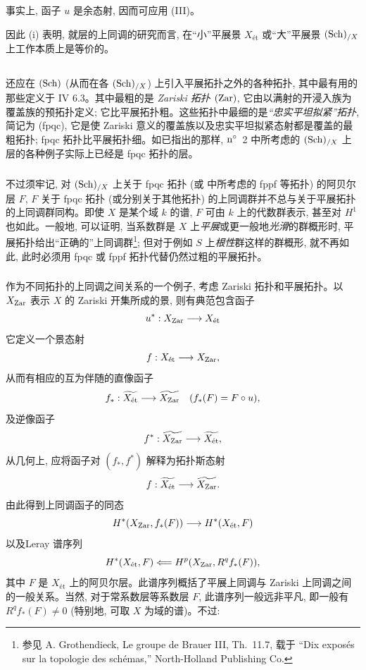 事实上, 函子 $u$ 是余态射, 因而可应用 (III)。

因此 (i) 表明, 就层的上同调的研究而言, 在“小”平展景 $X_{\text{ét}}$ 或“大”平展景 $(\operatorname{Sch})_{/X}$ 上工作本质上是等价的。

\setcounter{subsection}{1}
\subsection{}

还应在 $(\operatorname{Sch})$ (从而在各 $(\operatorname{Sch})_{/X}$) 上引入平展拓扑之外的各种拓扑, 其中最有用的那些定义于  IV 6.3。其中最粗的是 \emph{Zariski 拓扑} $(\operatorname{Zar})$, 它由以满射的开浸入族为覆盖族的预拓扑定义; 它比平展拓扑粗。这些拓扑中最细的是\emph{“忠实平坦拟紧”拓扑}, 简记为 (fpqc), 它是使 Zariski 意义的覆盖族以及忠实平坦拟紧态射都是覆盖的最粗拓扑; fpqc 拓扑比平展拓扑细。如已指出的那样, ${\rm n^{\circ}}$~2 中所考虑的 $(\operatorname{Sch})_{/X}$ 上层的各种例子实际上已经是 fpqc 拓扑的层。

\subsubsection{}

不过须牢记, 对 $(\operatorname{Sch})_{/X}$ 上关于 fpqc 拓扑 (或  中所考虑的 fppf 等拓扑) 的阿贝尔层 $F$, $F$ 关于 fpqc 拓扑 (或分别关于其他拓扑) 的上同调群并不总与关于\pageoriginale 平展拓扑的上同调群同构。即使 $X$ 是某个域 $k$ 的谱, $F$ 可由 $k$ 上的代数群表示, 甚至对 $H^1$ 也如此。一般地, 可以证明, 当系数群是 $X$ 上\emph{平展}或更一般地\emph{光滑}的群概形时, 平展拓扑给出“正确的”上同调群\footnote{参见 A. Grothendieck, Le groupe de Brauer III, Th.~11.7, 载于 “Dix exposés sur la topologie des schémas,” North-Holland Publishing Co.}; 但对于例如 $S$ 上\emph{根性}群这样的群概形, 就不再如此, 此时必须用 fpqc 或 fppf 拓扑代替仍然过粗的平展拓扑。

\subsubsection{}

作为不同拓扑的上同调之间关系的一个例子, 考虑 Zariski 拓扑和平展拓扑。以 $X_{\operatorname{Zar}}$ 表示 $X$ 的 Zariski 开集所成的景, 则有典范包含函子
$$
u^{\ast} : X_{\Zar} \to X_{\text{ét}}
$$
它定义一个景态射
$$
f : X_{\text{ét}} \to X_{\Zar}{\quoi},
$$
从而有相应的互为伴随的直像函子
$$
f_{\ast} : \widetilde{X_{\text{ét}}} \to \widetilde{X_{\Zar}}\quad
(f_{\ast} (F) = F \circ u){\quoi},
$$
及逆像函子
$$
f^{\ast} : \widetilde{X_{\Zar}} \to \widetilde{X_{\text{ét}}}{\quoi},
$$
从几何上, 应将函子对 $(f_{\ast},f^{\ast})$ 解释为拓扑斯态射
$$
f : \widetilde{X_{\text{ét}}} \to \widetilde{X_{\Zar}}{\quoi}.
$$
由此得到上同调函子的同态
$$
H^{\ast} (X_{\Zar}, f_{\ast} (F)) \to H^{\ast} (X_{\text{ét}}, F)
$$
以及\pageoriginale Leray 谱序列
$$
H^{\ast} (X_{\text{ét}}, F) \Longleftarrow H^{p} (X_{\operatorname{Zar}}, R^q
f_{\ast} (F)){},
$$
其中 $F$ 是 $X_{\text{ét}}$ 上的阿贝尔层。此谱序列概括了平展上同调与 Zariski 上同调之间的一般关系。当然, 对于常系数层等系数层 $F$, 此谱序列一般远非平凡, 即一般有 $R^qf_{\ast}(F)\neq0$ (特别地, 可取 $X$ 为域的谱)。不过:

